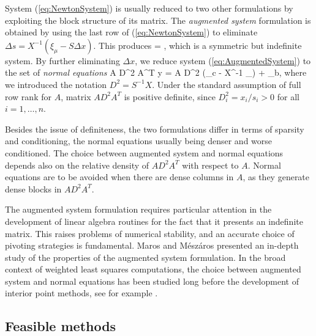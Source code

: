 System (\ref{eq:NewtonSystem}) is usually reduced to two other
formulations by exploiting the block structure of its
matrix.
%
The {\em augmented system} formulation is obtained by using 
the last row of (\ref{eq:NewtonSystem}) to eliminate
$\Delta s = X^{-1} (\xi_\mu - S\Delta x)$.
This produces
%
\be \label{eq:AugmentedSystem}
\left[ \begin{array}{cc}
    -X^{-1}S & A^T \\ A & 0
  \end{array} \right]
 =
\left[ \begin{array}{c}
    \xi_c - X^{-1}\xi_\mu \\ \xi_b
   \end{array} \right],
\ee
which is a symmetric but indefinite system.
%
By further eliminating $\Delta x$, we reduce system 
(\ref{eq:AugmentedSystem}) to the set of {\em normal equations}
%
\be \label{eq:NormalEquations}
  A D^2 A^T \Delta y = A D^2 (\xi_c - X^{-1} \xi_\mu) + \xi_b,
\ee
%
where we introduced the notation $D^2 = S^{-1} X$.
Under the standard assumption of full row rank for $A$, matrix 
$A D^2 A^T$ is positive definite, since $D^2_i = x_i/s_i > 0$ for
all $i = 1, \ldots, n$.

Besides the issue of definiteness, the two formulations differ in
terms of sparsity and conditioning, the normal equations usually 
being denser and worse conditioned.
The choice between augmented system and normal equations depends also on 
the relative density of $AD^2A^T$ with respect to $A$.
Normal equations are to be avoided when there are dense columns in $A$, 
as they generate dense blocks in $AD^2A^T$.

The augmented system formulation requires particular attention 
in the development of linear algebra routines for the fact that
it presents an indefinite matrix. This raises problems of numerical
stability, and an accurate choice of pivoting strategies is fundamental.
Maros and M\'esz\'aros \cite{MarosMeszaros} presented an in-depth 
study of the properties of the augmented system formulation.
In the broad context of weighted least squares computations, the choice
between augmented system and normal equations has been studied long
before the development of interior point methods, see for example
\cite{DuffErismanReid86}.

%
%
\subsection{Feasible methods}
\label{sec:FeasibleMethods}

